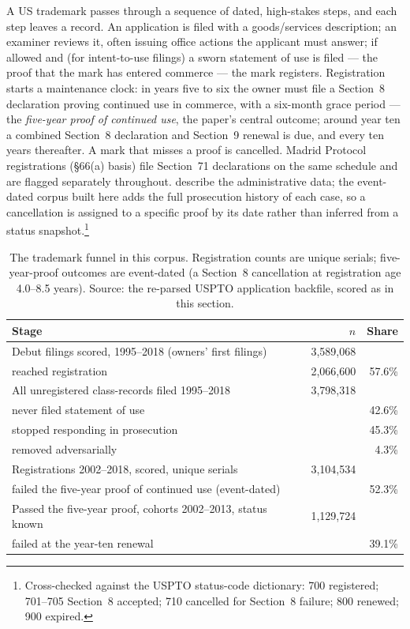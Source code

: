A US trademark passes through a sequence of dated, high-stakes steps, and
each step leaves a record. An application is filed with a goods/services
description; an examiner reviews it, often issuing office actions the
applicant must answer; if allowed and (for intent-to-use filings) a sworn
statement of use is filed --- the proof that the mark has entered commerce
--- the mark registers. Registration starts a maintenance clock: in years
five to six the owner must file a Section~8 declaration proving continued
use in commerce, with a six-month grace period --- the \emph{five-year
proof of continued use}, the paper's central outcome; around year ten a
combined Section~8 declaration and Section~9 renewal is due, and every ten
years thereafter. A mark that misses a proof is cancelled. Madrid Protocol
registrations (\S66(a) basis) file Section~71 declarations on the same
schedule and are flagged separately throughout. \citet{Graham2013}
describe the administrative data; the event-dated corpus built here adds
the full prosecution history of each case, so a cancellation is assigned
to a specific proof by its date rather than inferred from a status
snapshot.\footnote{Cross-checked against the USPTO status-code dictionary:
700 registered; 701--705 Section~8 accepted; 710 cancelled for Section~8
failure; 800 renewed; 900 expired.}

\begin{table}[h]\centering\small
\caption{The trademark funnel in this corpus. Registration counts are
unique serials; five-year-proof outcomes are event-dated (a Section~8
cancellation at registration age 4.0--8.5 years). Source: the re-parsed
USPTO application backfile, scored as in this section.}
\label{tab:funnel}
\begin{tabular}{lrr}
\toprule
Stage & $n$ & Share \\
\midrule
Debut filings scored, 1995--2018 (owners' first filings) & 3{,}589{,}068 & \\
\quad reached registration & 2{,}066{,}600 & 57.6\% \\
\midrule
All unregistered class-records filed 1995--2018 & 3{,}798{,}318 & \\
\quad never filed statement of use & & 42.6\% \\
\quad stopped responding in prosecution & & 45.3\% \\
\quad removed adversarially & & 4.3\% \\
\midrule
Registrations 2002--2018, scored, unique serials & 3{,}104{,}534 & \\
\quad failed the five-year proof of continued use (event-dated) & & 52.3\% \\
\midrule
Passed the five-year proof, cohorts 2002--2013, status known & 1{,}129{,}724 & \\
\quad failed at the year-ten renewal & & 39.1\% \\
\bottomrule
\end{tabular}
\end{table}

